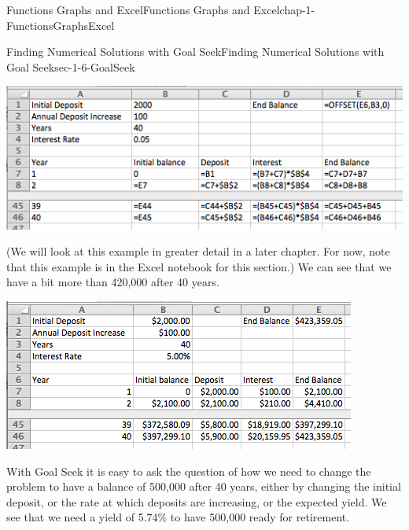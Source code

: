 \documentclass[oneside,10pt,]{book}
\numberwithin{equation}{section}
\begin{document}
\begin{chapterptx}{Functions Graphs and Excel}{}{Functions Graphs and Excel}{}{}{chap-1-FunctionsGraphsExcel}
\begin{sectionptx}{Finding Numerical Solutions with Goal Seek}{}{Finding Numerical Solutions with Goal Seek}{}{}{sec-1-6-GoalSeek}
\begin{sidebyside}{1}{0.1}{0.1}{0}
\begin{sbspanel}{0.8}%
\includegraphics[width=1\linewidth]{images/sec1-6-8.png}
\end{sbspanel}%
\end{sidebyside}%
%
\par
\hypertarget{p-487}{}%
(We will look at this example in greater detail in a later chapter.  For now, note that this example is in the Excel notebook for this section.)  We can see that we have a bit more than \textdollar{}420,000 after 40 years. \leavevmode%
\begin{sidebyside}{1}{0.1}{0.1}{0}%
\begin{sbspanel}{0.8}%
\includegraphics[width=1\linewidth]{images/sec1-6-9.png}
\end{sbspanel}%
\end{sidebyside}%
%
\par
\hypertarget{p-488}{}%
With Goal Seek it is easy to ask the question of how we need to change the problem to have a balance of \textdollar{}500,000 after 40 years, either by changing the initial deposit, or the rate at which deposits are increasing, or the expected yield.  We see that we need a yield of 5.74\% to have \textdollar{}500,000 ready for retirement. \leavevmode%
\begin{sidebyside}{1}{0.1}{0.1}{0}%
\begin{sbspanel}{0.8}%

\end{sbspanel}
\end{sidebyside}
\end{sectionptx}
\end{chapterptx}
\end{document}
